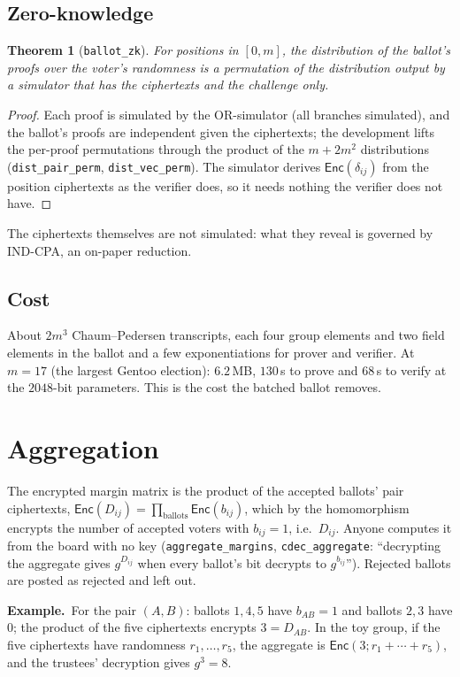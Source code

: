 \documentclass[11pt,a4paper]{article}
\newcommand{\Enc}{\mathsf{Enc}}
\newcommand{\rocq}[1]{\texttt{#1}}
\newcommand{\ex}[1]{\par\medskip\noindent\textbf{Example.}~#1\par\medskip}
\newtheorem{theorem}{Theorem}[section]
\theoremstyle{remark}
\begin{document}
\subsection{Zero-knowledge}
\begin{theorem}[\rocq{ballot\_zk}]
For positions in $[0, m]$, the distribution of the ballot's proofs over the
voter's randomness is a permutation of the distribution output by a
simulator that has the ciphertexts and the challenge only.
\end{theorem}
\begin{proof}
Each proof is simulated by the OR-simulator (all branches simulated), and
the ballot's proofs are independent given the ciphertexts; the development
lifts the per-proof permutations through the product of the $m + 2m^2$
distributions (\rocq{dist\_pair\_perm}, \rocq{dist\_vec\_perm}). The
simulator derives $\Enc(\delta_{ij})$ from the position ciphertexts as the
verifier does, so it needs nothing the verifier does not have.
\end{proof}
The ciphertexts themselves are not simulated: what they reveal is governed
by IND-CPA, an on-paper reduction.

\subsection{Cost}
About $2m^3$ Chaum--Pedersen transcripts, each four group elements and two
field elements in the ballot and a few exponentiations for prover and
verifier. At $m = 17$ (the largest Gentoo election): $6.2$\,MB, $130$\,s to
prove and $68$\,s to verify at the $2048$-bit parameters. This is the cost
the batched ballot removes.

\section{Aggregation}\label{sec:agg}
The encrypted margin matrix is the product of the accepted ballots' pair
ciphertexts, $\Enc(D_{ij}) = \prod_{\text{ballots}} \Enc(b_{ij})$, which by
the homomorphism encrypts the number of accepted voters with $b_{ij} = 1$,
i.e.\ $D_{ij}$. Anyone computes it from the board with no key
(\rocq{aggregate\_margins}, \rocq{cdec\_aggregate}: ``decrypting the
aggregate gives $g^{D_{ij}}$ when every ballot's bit decrypts to
$g^{b_{ij}}$''). Rejected ballots are posted as rejected and left out.

\ex{For the pair $(A, B)$: ballots $1, 4, 5$ have $b_{AB} = 1$ and ballots
$2, 3$ have $0$; the product of the five ciphertexts encrypts $3 = D_{AB}$.
In the toy group, if the five ciphertexts have randomness $r_1, \ldots,
r_5$, the aggregate is $\Enc(3; r_1 + \cdots + r_5)$, and the trustees'
decryption gives $g^3 = 8$.}
\end{document}

